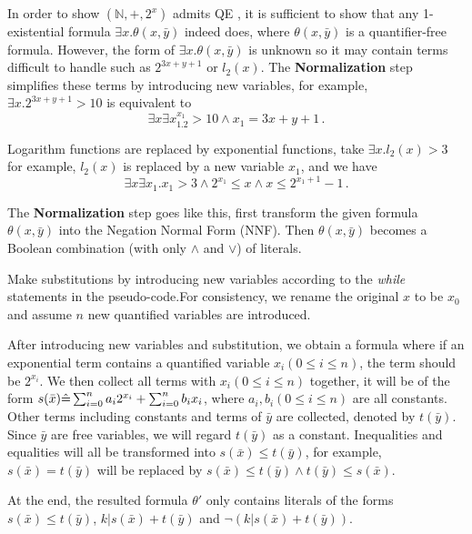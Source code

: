 In order to show $(\mathbb{N},+,2^x)$ admits QE , 
it is sufficient to show that any 1-existential formula $\exists x.\theta(x,\bar{y})$ indeed does, 
where $\theta(x,\bar{y})$ is a quantifier-free formula. 
However, the form of $\exists x.\theta(x,\bar{y})$ is unknown so it may contain terms difficult to handle such as $2^{3x+y+1}$ or $l_2(x)$.
The \textbf{Normalization} step simplifies these terms by introducing new variables, 
for example, $\exists x.2^{3x+y+1}>10$ is equivalent to
$$\exists x\exists x_1.2^{x_1}>10 \wedge x_1 =3x+y+1\,.$$

Logarithm functions are replaced by exponential functions, take $\exists x.l_2(x)>3$ for example, $l_2(x)$ is replaced by a new variable $x_1$, and we have  
$$\exists x\exists x_1. x_1 > 3 \wedge 2^{x_1}\le x \wedge x\le 2^{x_1+1}-1\,.$$

The \textbf{Normalization} step goes like this, first transform the given formula $\theta(x,\bar{y})$ into the Negation Normal Form (NNF).
Then $\theta(x,\bar{y})$ becomes a Boolean combination (with only $\wedge$ and $\vee$) of literals.

Make substitutions by introducing new variables according to the \textit{while} statements in the pseudo-code.For consistency, we rename the original $x$ to be $x_0$ and assume $n$ new quantified variables are introduced.

After introducing new variables and substitution, 
we obtain a formula where if an exponential term contains a quantified variable $x_i(0\le i\le n)$, the term should be $2^{x_i}$.
We then collect all terms with $x_i(0\le i\le n)$ together, 
it will be of the form $s(\bar{x})\hat{=} \sum_{i=0}^{n} a_i 2^{x_i} + \sum_{i=0}^n b_i x_i$, where $a_i,b_i(0\le i \le n)$ are all constants.
Other terms including constants and terms of $\bar{y}$ are collected,  
denoted by $t(\bar{y})$. 
Since $\bar{y}$ are free variables, 
we will regard $t(\bar{y})$ as a constant.
Inequalities and equalities will all be transformed into $s(\bar{x})\le t(\bar{y})$, for example, $s(\bar{x}) = t(\bar{y})$ will be replaced by $s(\bar{x})\le t(\bar{y})\wedge t(\bar{y})\le s(\bar{x})$.

At the end, the resulted formula $\theta'$ only contains literals of the forms $s(\bar{x})\le t(\bar{y})$, $k|s(\bar{x})+t(\bar{y})$ and $\neg  (k|s(\bar{x})+t(\bar{y}))$.


